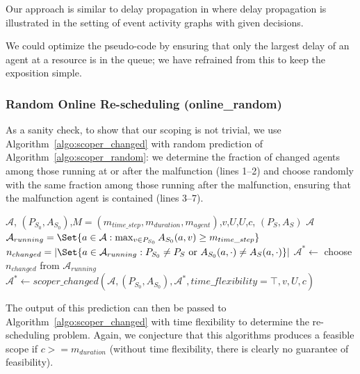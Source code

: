 \documentclass{article}
\begin{document}
Our approach is similar to delay propagation in \cite{handbookofoptimizationinrailwayindustry} where delay propagation is illustrated in the setting of event activity graphs with given decisions.

We could optimize the pseudo-code by ensuring that only the largest delay of an agent at a resource is in the queue; we have refrained from this to keep the exposition simple.

\subsubsection{Random Online Re-scheduling (online\_random)}
\label{subsubsec:scope_online_random}

As a sanity check, to show that our scoping is not trivial, we use Algorithm~\ref{algo:scoper_changed} with random prediction of Algorithm~\ref{algo:scoper_random}: we determine the fraction of changed agents among those running at or after the malfunction (lines 1--2) and choose randomly with the same fraction among those running after the malfunction, ensuring that the malfunction agent is contained (lines 3--7).


\begin{algorithm}
	\caption{$scoper\_offline\_random$} \label{algo:scoper_random}
	\begin{algorithmic}[1]
		\Require $\mathcal{A}$, $(P_{S_0},A_{S_0})$,$M=(m_{time\_step},m_{duration},m_{agent})$,$v$,$U$,$U$,$c$, $(P_S,A_S)$
	    \Ensure $\mathcal{A}$
	    \State $\mathcal{A}_{running}=\Set{a \in \mathcal{A}: \max_{v \in P_{S_0}} A_{S_0}(a,v) \geq m_{time\_step}}$
	    \State $n_{changed} = \left| \Set{a\in \mathcal{A}_{running}:  P_{S_0} \not=P_{S} \textrm { or } A_{S_0}(a,\cdot) \not= A_{S}(a,\cdot)} \right|$
	    \State $\mathcal{A}^* \leftarrow$ choose $n_{changed}$ from $\mathcal{A}_{running}$
	    \State $\mathcal{A}^* \leftarrow scoper\_changed(\mathcal{A},(P_{S_0},A_{S_0}),\mathcal{A}^*,time\_flexibility=\top,v,U,c)$
	\end{algorithmic}
\end{algorithm}
The output of this prediction can then be passed to Algorithm~\ref{algo:scoper_changed} with time flexibility to determine the re-scheduling problem.
Again, we conjecture that this algorithms produces a feasible scope if $c >= m_{duration}$ (without time flexibility, there is clearly no guarantee of feasibility).
\end{document}
